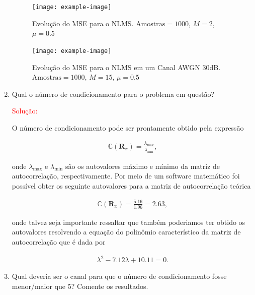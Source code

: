 \begin{enumerate}
        \begin{figure}[!htp]
            \centering
            \texttt{[image: example-image]}
            \caption{Evolução do MSE para o NLMS. $\text{Amostras} = 1000$, $M = 2$, $\mu = 0.5$}
            \label{fig:nlms_mse}
        \end{figure}
        
        \begin{figure}[!htp]
            \centering
            \texttt{[image: example-image]}
            \caption{Evolução do MSE para o NLMS em um Canal AWGN 30dB. $\text{Amostras} = 1000$, $M = 15$, $\mu = 0.5$}
            \label{fig:nlms_awgn}
        \end{figure}

\clearpage 

    \item Qual o número de condicionamento para o problema em questão?
    
        \textcolor{red}{Solução:}
        
        O número de condicionamento pode ser prontamente obtido pela expressão

        \begin{align}
            \mathbb{C} (\mathbf{R}_{x}) = \frac{\lambda_{\text{max}}}{\lambda_{\text{min}}},
        \end{align}
    
        onde $\lambda_{\text{max}}$ e $\lambda_{\text{min}}$ são os autovalores máximo e mínimo da matriz de autocorrelação, respectivamente. Por meio de um software
        matemático foi possível obter os seguinte autovalores para a matriz de autocorrelação teórica

        \begin{align}
            \mathbb{C} (\mathbf{R}_{x}) = \frac{5.16}{1.96} = 2.63,
        \end{align}

        onde talvez seja importante ressaltar que também poderiamos ter obtido os autovalores resolvendo a equação do polinômio
        característico da matriz de autocorrelação que é dada por

        \begin{align}
            \lambda^{2} - 7.12 \lambda + 10.11 = 0. 
        \end{align}

    \item Qual deveria ser o canal para que o número de condicionamento fosse menor/maior que 5?
    Comente os resultados.
    

\end{enumerate}
